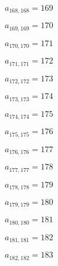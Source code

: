 \documentclass[a4paper,12pt]{article}
\begin{document}
$a _{ 168, 168 } = 169$

$a _{ 169, 169 } = 170$

$a _{ 170, 170 } = 171$

$a _{ 171, 171 } = 172$

$a _{ 172, 172 } = 173$

$a _{ 173, 173 } = 174$

$a _{ 174, 174 } = 175$

$a _{ 175, 175 } = 176$

$a _{ 176, 176 } = 177$

$a _{ 177, 177 } = 178$

$a _{ 178, 178 } = 179$

$a _{ 179, 179 } = 180$

$a _{ 180, 180 } = 181$

$a _{ 181, 181 } = 182$

$a _{ 182, 182 } = 183$
\end{document}

